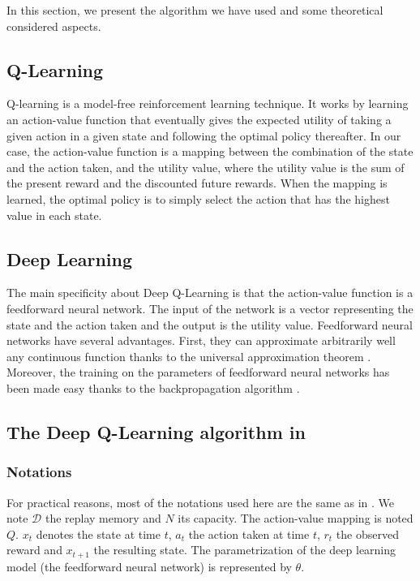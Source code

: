 \documentclass{article} %
\begin{document}
In this section, we present the algorithm we have used and some theoretical considered aspects.

\subsection{Q-Learning}

Q-learning is a model-free reinforcement learning technique. It works by learning an action-value function that eventually gives the expected utility of taking a given action in a given state and following the optimal policy thereafter. In our case, the action-value function is a mapping between the combination of the state and the action taken, and the utility value, where the utility value is the sum of the present reward and the discounted future rewards. When the mapping is learned, the optimal policy is to simply select the action that has the highest value in each state. 

\subsection{Deep Learning}

The main specificity about Deep Q-Learning is that the action-value function is a feedforward neural network. The input of the network is a vector representing the state and the action taken and the output is the utility value. Feedforward neural networks have several advantages. First, they can approximate arbitrarily well any continuous function thanks to the universal approximation theorem \cite{universal}. Moreover, the training on the parameters of feedforward neural networks has been made easy thanks to the backpropagation algorithm \cite{backprop}.

\subsection{The Deep Q-Learning algorithm in \cite{deepmind}}


\subsubsection{Notations}
For practical reasons, most of the notations used here are the same as in \cite{deepmind}. We note $\mathcal{D}$ the replay memory and $N$ its capacity. The action-value mapping is noted $Q$. $x_t$ denotes the state at time $t$, $a_t$ the action taken at time $t$, $r_t$ the observed reward and $x_{t+1}$ the resulting state. The parametrization of the deep learning model (the feedforward neural network) is represented by $\theta$.
\end{document}
